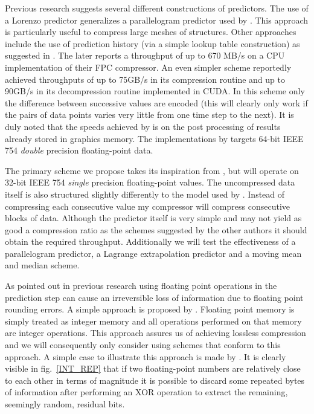 \documentclass{acm_proc_article-sp}
\begin{document}
Previous research suggests several different constructions of predictors. The use of a Lorenzo predictor \cite{lindstrom2006fast} generalizes a parallelogram predictor used by \cite{engelson2000lossless}. This
approach is particularly useful to compress large meshes of structures. Other approaches include the use of prediction history (via a simple lookup table construction) as suggested in \cite{1607248,4589203,4976448}. 
The later reports a throughput of up to 670 MB/s on a CPU implementation of their FPC compressor. An even simpler scheme \cite{O'Neil:2011:FDC:1964179.1964189} reportedly achieved throughputs of up to 75GB/s in its 
compression routine and up to 90GB/s in its decompression routine implemented in CUDA. In this scheme only the difference between successive values are encoded (this will clearly only work if the pairs of 
data points varies very little from one time step to the next). It is duly noted that the speeds achieved by \cite{O'Neil:2011:FDC:1964179.1964189} is on the post processing of results already stored in 
graphics memory. The implementations by \cite{O'Neil:2011:FDC:1964179.1964189,1607248,4589203,4976448,engelson2000lossless} targets 64-bit IEEE 754 \textit{double} precision floating-point data.

The primary scheme we propose takes its inspiration from \cite{O'Neil:2011:FDC:1964179.1964189}, but will operate on 32-bit IEEE 754 \textit{single} precision floating-point values. The uncompressed data itself 
is also structured slightly differently to the model used by \cite{O'Neil:2011:FDC:1964179.1964189}. Instead of compressing each consecutive value my compressor will compress consecutive blocks of data. Although 
the predictor itself is very simple and may not yield as good a compression ratio as the schemes suggested by the other authors it should obtain the required throughput. Additionally we will test the effectiveness
of a parallelogram predictor, a Lagrange extrapolation predictor \cite{engelson2000lossless} and a moving mean and median scheme.

As pointed out in previous research \cite{engelson2000lossless,lindstrom2006fast} using floating point operations in the prediction step can cause an irreversible loss of information due to floating point
rounding errors. A simple approach is proposed by \cite{engelson2000lossless}. Floating point memory is simply treated as integer memory and all operations performed on that memory are integer operations. This
approach assures us of achieving lossless compression and we will consequently only consider using schemes that conform to this approach. A simple case to illustrate this approach is made by \cite{engelson2000lossless}.
It is clearly visible in fig.~\ref{INT_REP} that if two floating-point numbers are relatively close to each other in terms of magnitude it is possible to discard some repeated bytes of information after performing 
an XOR operation to extract the remaining, seemingly random, residual bits.
\end{document}

